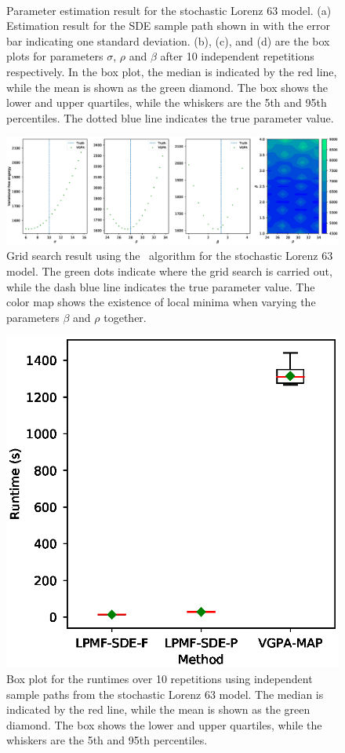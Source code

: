 \begin{figure}
\begin{subfigure}{0.48\textwidth}
        \caption{\ }
        \label{fig-lorenz-63-parameters-beta-boxplot}
    \end{subfigure}
    \caption{Parameter estimation result for the stochastic Lorenz 63 model. (a) Estimation result for the SDE sample path shown in  with the error bar indicating one standard deviation. (b), (c), and (d) are the box plots for parameters $\sigma$,  $\rho$ and $\beta$ after 10 independent repetitions respectively. In the box plot, the median is indicated by the red line, while the mean is shown as the green diamond. The box shows the lower and upper quartiles, while the whiskers are the 5th and 95th percentiles. The dotted blue line indicates the true parameter value.}
    \label{fig-lorenz-63-parameters-group}
\end{figure}

\begin{figure}
    \centering
    \includegraphics[width=\linewidth]{graphics/lorenz-63-parameters-grid-search}
    \caption{Grid search result using the \algovgpa\ algorithm for the stochastic Lorenz 63 model. The green dots indicate where the grid search is carried out, while the dash blue line indicates the true parameter value. The color map shows the existence of local minima when varying the parameters $\beta$ and $\rho$ together.}
    \label{fig-lorenz-63-parameters-grid-search}    
\end{figure}

\begin{figure}
    \centering
    \includegraphics[width=0.48\linewidth]{graphics/lorenz-63-runtime-boxplot}
    \caption{Box plot for the runtimes over 10 repetitions using independent sample paths from the stochastic Lorenz 63 model. The median is indicated by the red line, while the mean is shown as the green diamond. The box shows the lower and upper quartiles, while the whiskers are the 5th and 95th percentiles.}
    \label{fig-lorenz-63-runtime-boxplot}    
\end{figure}

